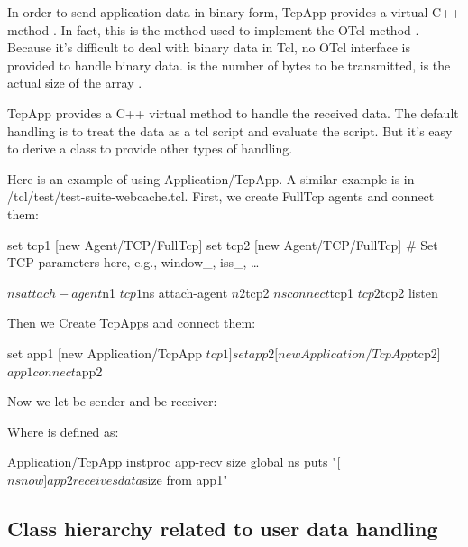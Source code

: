 In order to send application data in binary form, TcpApp provides a 
virtual C++ method .
In fact, this is the method used to implement the OTcl method .
Because it's difficult to deal with binary data in Tcl, no OTcl interface
is provided to handle binary data.  is the number of bytes 
to be transmitted,  is the actual size of the array .

TcpApp provides a C++ virtual method 
to handle the received data. The default handling is to treat the data 
as a tcl script and evaluate the script. But it's easy to derive a class
to provide other types of handling.

Here is an example of using Application/TcpApp. A similar example is 
 in \ns/tcl/test/test-suite-webcache.tcl.
First, we create FullTcp agents and connect them:

\begin{program}
        set tcp1 [new Agent/TCP/FullTcp]
        set tcp2 [new Agent/TCP/FullTcp]
        # {\cf Set TCP parameters here, e.g., window_, iss_, \ldots}

        $ns attach-agent $n1 $tcp1
        $ns attach-agent $n2 $tcp2
        $ns connect $tcp1 $tcp2
        $tcp2 listen
\end{program}

Then we Create TcpApps and connect them:

\begin{program}
        set app1 [new Application/TcpApp $tcp1]
        set app2 [new Application/TcpApp $tcp2]
        $app1 connect $app2
\end{program}

Now we let  %
be sender and  %
be receiver:


Where  is defined as:

\begin{program}
        Application/TcpApp instproc app-recv { size } {
                global ns
                puts "[$ns now] app2 receives data $size from app1"
        }
\end{program}

\subsection{Class hierarchy related to user data handling}

